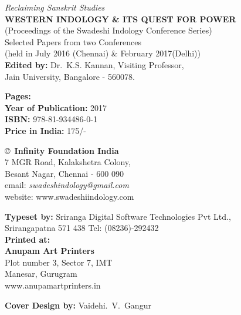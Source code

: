 \thispagestyle{empty}
\noindent
{\fontsize{9}{11}\selectfont\sl Reclaiming Sanskrit Studies}\\
{\bf WESTERN INDOLOGY \& ITS QUEST FOR POWER}\\ 
(Proceedings of the Swadeshi Indology Conference Series)\\
Selected Papers from two Conferences\\ 
(held in July 2016 (Chennai) \& February 2017(Delhi))\\
{\bf Edited by:} Dr.\ K.S. Kannan, Visiting Professor,\\ 
Jain University, Bangalore - 560078.
\vfill

\noindent
{\bf Pages:} \pageref{bookend}\\
{\bf Year of Publication:} 2017\\
{\bf ISBN:} 978-81-934486-0-1\\
{\bf Price in India:} 175/-
\vfill

\noindent
\copyright\ {\bf Infinity Foundation India}\\ 
7 MGR Road, Kalakshetra Colony,\\ 
Besant Nagar, Chennai - 600 090\\
email: {\sl swadeshindology@gmail.com}\\ 
website: www.swadeshiindology.com 
\vfill

\noindent
{\bf Typeset by:} Sriranga Digital Software Technologies Pvt Ltd.,\\ 
Srirangapatna 571 438 Tel: (08236)-292432\\

\noindent
{\bf Printed at:}\\
{\bf Anupam Art Printers}\\
Plot number 3, Sector 7, IMT\\
Manesar, Gurugram\\
www.anupamartprinters.in
\bigskip

\noindent
{\bf Cover Design by:} Vaidehi.\ V.\ Gangur
